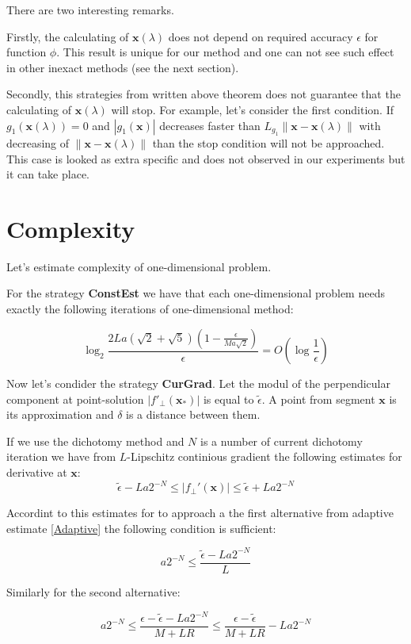 \documentclass[12pt]{article}
\begin{document}
There are two interesting remarks.

Firstly, the calculating of $\textbf{x}(\lambda)$ does not depend on required accuracy $\epsilon$ for function $\phi$. This result is unique for our method and one can not see such effect in other inexact methods (see the next section).

Secondly, this strategies from written above theorem does not guarantee that the calculating of $\textbf{x}(\lambda)$ will stop. For example, let's consider the first condition. If $g_1(\textbf{x}(\lambda)) = 0$  and $|g_1(\textbf{x})|$ decreases faster than $L_{g_1}\|\textbf{x}-\textbf{x}(\lambda)\|$ with decreasing of $\|\textbf{x}-\textbf{x}(\lambda)\|$ than the stop condition will not be approached. This case is looked as extra specific and does not observed in our experiments but it can take place.



\section{Complexity}

Let's estimate complexity of one-dimensional problem.

For the strategy \textbf{ConstEst} we have that each one-dimensional problem needs exactly the following iterations of one-dimensional method:

$$\log_2\frac{2La(\sqrt{2}+\sqrt{5})(1-\frac{\epsilon}{Ma\sqrt{2}})}{\epsilon} = O\left(\log \frac{1}{\epsilon}\right)$$

Now let's condider the strategy \textbf{CurGrad}. Let the modul of the perpendicular component at point-solution $|f'_\perp(\textbf{x}_*)|$ is equal to $\tilde{\epsilon}$. A point from segment $\textbf{x}$ is its approximation and $\delta$ is a distance between them.

If we use the dichotomy method and $N$ is a number of current dichotomy iteration we have from $L$-Lipschitz continious gradient the following estimates for derivative at $\textbf{x}$:
$$\tilde{\epsilon}-La2^{-N} \leq |f_\perp'(\textbf{x})|\leq \tilde{\epsilon}+La2^{-N}$$

Accordint to this estimates for to approach a the first alternative from adaptive estimate \ref{Adaptive} the following condition is sufficient:

$$a2^{-N} \leq \frac{\tilde{\epsilon}-La2^{-N}}{L}$$

Similarly for the second alternative:

$$a2^{-N} \leq \frac{\epsilon - \tilde{\epsilon} - La2^{-N}}{M+LR}\leq \frac{\epsilon - \tilde{\epsilon}}{M+LR} - La2^{-N}$$
\end{document}
